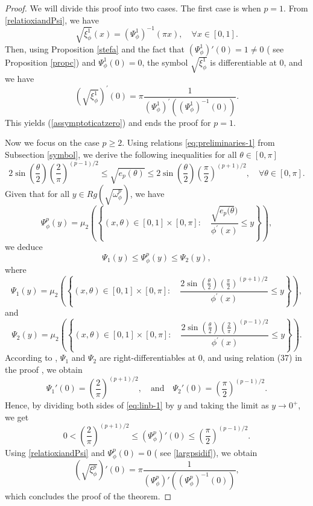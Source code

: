 \documentclass[11pt]{article}
\begin{document}
\begin{proof} 

 We will divide this proof into two cases. The first case is when $p=1$. From \eqref{relatioxiandPsi}, we have 
  \begin{equation*}
\sqrt{\xi_{\phi}^1}(x)=\left(\Psi_{\phi}^{1}\right)^{-1}(\pi x),\quad \forall x\in[0,1].
\end{equation*}
Then, using Proposition \ref{stefa} and  the fact that $\left(\Psi_{\phi}^{1}\right)'(0)=1\neq 0$ ( see Proposition \ref{propc}) and $\Psi_{\phi}^{1}(0)=0$, the symbol  $\sqrt{\xi_{\phi}^1}$ is differentiable at $0$, and we have
$$
\left(\sqrt{\xi_{\phi}^1}\right)^{'}(0)=\pi \dfrac{1}{\left(\Psi_{\phi}^{1}\right)^{'}\left(\left(\Psi_{\phi}^{1}\right)^{-1}(0)\right)}.
$$
This yields (\ref{assymptoticatzero}) and ends the proof for $p=1.$
   
Now we focus on the case $p\geq 2$. Using relations \eqref{eq:preliminaries-1} from Subsection \ref{symbol}, we derive the following inequalities for all $\theta\in[0,\pi]$
$$
2\sin\left(\frac{\theta}{2}\right)\left(\frac{2}{\pi}\right)^{(p-1)/2}\leq\sqrt{e_p(\theta)}\leq 2\sin\left(\frac{\theta}{2}\right)\left(\frac{\pi}{2}\right)^{(p+1)/2},\quad \forall \theta\in[0,\pi].
$$
Given that for all $y\in Rg\left(\sqrt{\omega^p_{\phi}}\right) $, we have
$$
\Psi_{\phi}^{p}(y)=\mu_{2} \left( \left\{  (x,\theta)\in [0,1]\times[0,\pi]:\quad \frac{\sqrt{e_p(\theta})}{\phi^{'}(x)}\leq y    \right\} \right),
$$
we deduce 
\begin{equation}\label{eq:linb-1}
\Psi_{1}(y)\leq \Psi_{\phi}^{p}(y)\leq \Psi_{2}(y),
\end{equation}
where
$$
\Psi_{1}(y)=\mu_{2} \left( \left\{  (x,\theta)\in [0,1]\times[0,\pi]:\quad \frac{2\sin\left(\frac{\theta}{2}\right)\left(\frac{\pi}{2}\right)^{(p+1)/2}}{\phi^{'}(x)}\leq y    \right\} \right),
$$
and 
$$
\Psi_{2}(y)=\mu_{2} \left( \left\{  (x,\theta)\in [0,1]\times[0,\pi]:\quad \frac{2\sin\left(\frac{\theta}{2}\right)\left(\frac{2}{\pi}\right)^{(p-1)/2}}{\phi^{'}(x)}\leq y    \right\} \right).
$$
According to \cite[Proposition 1]{bianchi2018spectral}, $\Psi_1$ and $\Psi_2$ are right-differentiables at $0$, and using relation (37) in the proof \cite[Proposition 1]{bianchi2018spectral}, we obtain 
$$
\Psi_1'(0) = \left( \frac{2}{\pi} \right)^{(p+1)/2}, \quad \text{and} \quad \Psi_2'(0) = \left( \frac{\pi}{2} \right)^{(p-1)/2}.
$$
Hence, by dividing both sides of \eqref{eq:linb-1} by $y$ and taking the limit as $y \rightarrow 0^+$, we get
$$
0<\left(\frac{2}{\pi}\right)^{(p+1)/2}\leq \left(\Psi_{\phi}^{p}\right)'(0)\leq\left(\frac{\pi}{2}\right)^{(p-1)/2}.
$$
Using \eqref{relatioxiandPsi} and $\Psi_{\phi}^{p}(0)=0$ ( see \eqref{largpsidif}), we obtain 
$$
\left(\sqrt{\xi_{\phi}^p}\right)'(0)=\pi \dfrac{1}{\left(\Psi_{\phi}^{p}\right)'\left(\left(\Psi_{\phi}^{p}\right)^{-1}(0)\right)},
$$ 
which concludes the proof of the theorem.
\end{proof}
\end{document}
